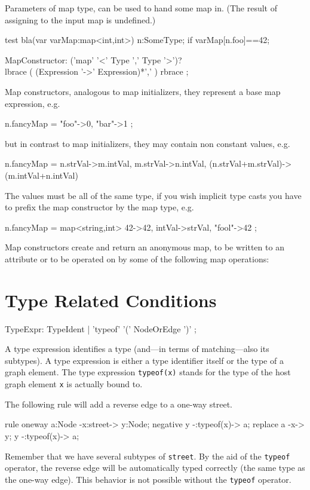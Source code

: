 Parameters of map type, can be used to hand some map in.
(The result of assigning to the input map is undefined.)
\begin{grgen}
test bla(var varMap:map<int,int>) 
{
	n:SomeType;
	if {  varMap[n.foo]==42; }
}
\end{grgen}

\begin{rail}
  MapConstructor: ('map' '<' Type ',' Type '>')? \\ lbrace ( (Expression '->' Expression)*',' ) rbrace ;
\end{rail}

Map constructors, analogous to map initializers, they represent a base map expression, e.g. 
\begin{grgenlet}
n.fancyMap = { "foo"->0, "bar"->1 };
\end{grgenlet}
but in contrast to map initializers, they may contain non constant values, e.g.
\begin{grgenlet}
n.fancyMap = { n.strVal->m.intVal, m.strVal->n.intVal, (n.strVal+m.strVal)->(m.intVal+n.intVal) } 
\end{grgenlet}
The values must be all of the same type, if you wish implicit type casts 
you have to prefix the map constructor by the map type, e.g.
\begin{grgenlet}
n.fancyMap = map<string,int>{ 42->42, intVal->strVal, "fool"->42 };
\end{grgenlet}
Map constructors create and return an anonymous map, to be written to an attribute or to be operated on by some of the following map operations:


\section{Type Related Conditions}
\label{typeexpressions}

\begin{rail}
  TypeExpr: TypeIdent | 'typeof' '(' NodeOrEdge ')' ;
\end{rail}
A type expression identifies a type (and---in terms of matching---also its subtypes).
A type expression is either a type identifier itself or the type of a graph element.
The type expression \texttt{typeof(x)} stands for the type of the host graph element \texttt{x} is actually bound to.
\begin{example}
The following rule will add a reverse edge to a one-way street.
\begin{grgen}
rule oneway {
    a:Node -x:street-> y:Node;
    negative {
        y -:typeof(x)-> a;
    }
    replace {
        a -x-> y;
        y -:typeof(x)-> a;
    }
}
\end{grgen}
Remember that we have several subtypes of \texttt{street}. By the aid of the \texttt{typeof} operator, the reverse edge will be automatically typed correctly (the same type as the one-way edge). This behavior is not possible without the \texttt{typeof} operator.
\end{example}

